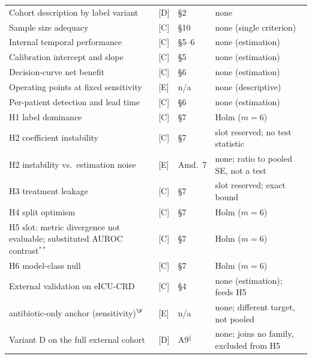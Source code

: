 {\begin{longtable}{p{5.0cm}lp{1.9cm}p{4.2cm}}
        Cohort description by label variant       & [D] & \S2     & none                                   \\
        Sample size adequacy                      & [C] & \S10    & none (single criterion)                \\
        Internal temporal performance             & [C] & \S5--6  & none (estimation)                      \\
        Calibration intercept and slope           & [C] & \S5     & none (estimation)                      \\
        Decision-curve net benefit                & [C] & \S6     & none (estimation)                      \\
        Operating points at fixed sensitivity     & [E] & n/a     & none (descriptive)                     \\
        Per-patient detection and lead time       & [C] & \S6     & none (estimation)                      \\
        H1 label dominance                        & [C] & \S7     & Holm ($m=6$)                           \\
        H2 coefficient instability                & [C] & \S7     & slot reserved; no test statistic       \\
        H2 instability vs.\ estimation noise      & [E] & Amd.\ 7 & none; ratio to pooled SE, not a test   \\
        H3 treatment leakage                      & [C] & \S7     & slot reserved; exact bound             \\
        H4 split optimism                         & [C] & \S7     & Holm ($m=6$)                           \\
        H5 slot: metric divergence not evaluable;
        substituted AUROC contrast$^{**}$          & [C] & \S7     & Holm ($m=6$)                           \\
        H6 model-class null                       & [C] & \S7     & Holm ($m=6$)                           \\
        External validation on eICU-CRD           & [C] & \S4     & none (estimation); feeds H5            \\
        \quad antibiotic-only anchor (sensitivity)$^\P$ & [E] & n/a     & none; different target, not pooled \\
        \quad Variant D on the full external cohort & [D] & A9$^\|$ & none; joins no family, excluded from H5 \\

\end{longtable}}
